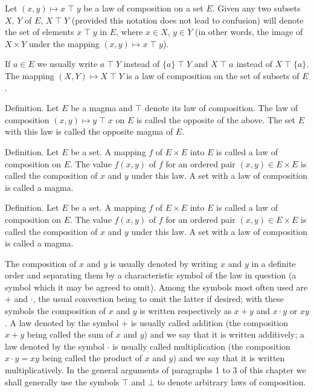 \documentclass[twoside,usebookdim]{bourbaki}
\begin{document}
Let $(x,y)\mapsto x\mathbin{\top} y$ be a law of composition on a set $E$. Given
any two subsets $X$, $Y$ of $E$, $X \mathbin{\top} Y$ (provided this notation does
not lead to confusion) will denote the set of elements $x\mathbin{\top} y$ in $E$,
where $x\in X$, $y\in Y$ (in other words, the image of $X\times Y$ under
the mapping $(x,y)\mapsto x\mathbin{\top} y$).

If $a\in E$ we usually write $a\mathbin{\top} Y$ instead of $\{a\}\mathbin{\top} Y$ and
$X\mathbin{\top} a$ instead of $X\mathbin{\top}\{a\}$. The mapping $(X, Y)\mapsto X\mathbin{\top} Y$
is a law of composition on the set of subsets of $E$.

Definition. Let $E$ be a magma and $\mathbin{\top}$ denote its law of composition. The law of
composition $(x, y)\mapsto y\mathbin{\top} x$ on $E$ is called the opposite of the
above. The set $E$ with this law is called the opposite magma of $E$.


Definition.
Let $E$ be a set. A mapping $f$ of $E\times E$ into $E$ is called a law
of composition on $E$. The value $f(x,y)$ of $f$ for an ordered pair
$(x,y)\in E\times E$ is called the composition of $x$ and $y$ under this
law. A set with a law of composition is called a magma.

Definition.
Let $E$ be a set. A mapping $f$ of $E\times E$ into $E$ is called a law
of composition on $E$. The value $f(x,y)$ of $f$ for an ordered pair
$(x,y)\in E\times E$ is called the composition of $x$ and $y$ under this
law. A set with a law of composition is called a magma.

The composition of $x$ and $y$ is usually denoted by writing $x$ and $y$
in a definite order and separating them by a characteristic symbol of
the law in question (a symbol which it may be agreed to omit). Among the
symbols most often used are $+$ and $\cdot$, the usual convection being
to omit the latter if desired; with these symbols the composition of $x$
and $y$ is written respectively as $x + y$ and $x\cdot y$ or $xy$.
A law denoted by the symbol $+$ is usually called addition (the
composition $x + y$ being called the sum of $x$ and $y$) and we say that
it is written additively; a law denoted by the symbol $\cdot$ is usually
called multiplication (the composition $x\cdot y = xy$ being called the
product of $x$ and $y$) and we say that it is written
multiplicatively. In the general arguments of paragraphs 1 to 3 of this
chapter we shall generally use the symbols $\mathbin{\top}$ and $\bot$ to denote
arbitrary laws of composition.
\end{document}
